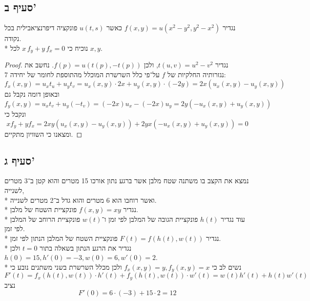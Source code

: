 \subsection{סעיף ב'}
נגדיר $f(x, y) = u(x^2 - y^2, y^2 - x^2)$ כאשר $u(t, s)$ פונקציה דיפרנציאבילית בכל נקודה. \\*
נוכיח כי $x \, f_y + y \, f_x = 0$ לכל $x, y$.
\begin{proof}
	נגדיר $t(u, v) = u^2 - v^2$, ולכן $f(p) = u(t(p), -t(p))$.
	נחשב את נגזרותיה החלקיות של $f$ על־פי כלל השרשרת המוכלל מהתוספת לחומר של יחידה 7:
	\[
		f_x(x, y)
		= u_x t_u + u_y t_v
		= u_x(x, y) \cdot 2x + u_y(x, y) \cdot (-2y)
		= 2x (u_x(x, y) - u_y(x, y))
	\]
	ובאופן דומה נקבל גם
	\[
		f_y(x, y)
		= u_x t_v + u_y (-t_v)
		= (-2x) u_x - (-2x) u_y
		= 2y (-u_x(x, y) + u_y(x, y))
	\]
	ונקבל כי
	\[
		x f_y + y f_x
		= 2xy (u_x(x, y) - u_y(x, y))
		+ 2yx (-u_x(x, y) + u_y(x, y))
		= 0
	\]
	ומצאנו כי השוויון מתקיים.
\end{proof}

\subsection{סעיף ג'}
נמצא את הקצב בו משתנה שטח מלבן אשר ברגע נתון אורכו 15 מטרים והוא קטן ב־3 מטרים לשנייה, \\*
ואשר רוחבו הוא 6 מטרים והוא גדל ב־2 מטרים לשנייה. \\*
נגדיר $f(x, y) = xy$ פונקציית השטח של מלבן. \\*
עוד נגדיר $h(t)$ פונקציית הגובה של המלבן לפי זמן ו־$w(t)$ פונקציית הרוחב של המלבן לפי זמן. \\*
נגדיר $F(t) = f(h(t), w(t))$ פונקציית השטח של המלבן הנתון לפי זמן. \\*
נגדיר את הרגע הנתון בשאלה בתור $t = 0$ ולכן $h(0) = 15, h'(0) = -3, w(0) = 6, w'(0) = 2$. \\*
נשים לב כי $f_x(x, y) = y, f_y(x, y) = x$ ולכן מכלל השרשרת בשני משתנים נובע כי
\[
	F'(t) = f_x(h(t), w(t)) \cdot h'(t) + f_y(h(t), w(t)) \cdot w'(t)
	= w(t) h'(t) + h(t) w'(t)
\]
נציב
\[
	F'(0) = 6 \cdot (-3) + 15 \cdot 2 = 12
\]

\clearpage
